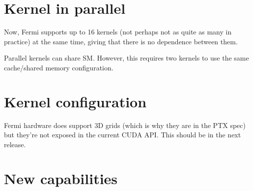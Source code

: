 \section{Kernel in parallel}
\label{sec:kernel-parallel}

Now, Fermi supports up to 16 kernels (not perhaps not as quite as many
in practice) at the same time, giving that there is no dependence
between them. 

Parallel kernels can share SM. However, this requires two kernels to use the
same cache/shared memory configuration. 

\section{Kernel configuration}
\label{sec:kernel-configuration}

Fermi hardware does support 3D grids (which is why they are in the PTX
spec) but they're not exposed in the current CUDA API. This should be
in the next release.

\section{New capabilities}
\label{sec:new-capabilities}

